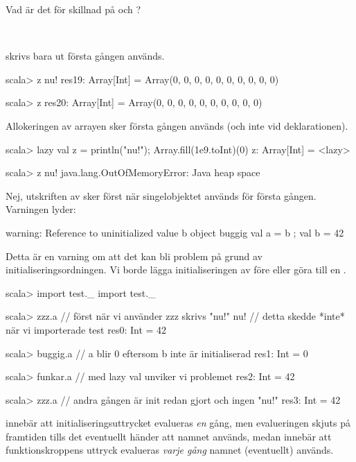 \Subtask Vad är det för skillnad på  och ?

\SOLUTION

\TaskSolved \what~

\SubtaskSolved {} skrivs bara ut första gången  används.
\begin{REPL}
scala> z
nu!
res19: Array[Int] = Array(0, 0, 0, 0, 0, 0, 0, 0, 0, 0)

scala> z
res20: Array[Int] = Array(0, 0, 0, 0, 0, 0, 0, 0, 0, 0)
\end{REPL}

\SubtaskSolved Allokeringen av arrayen sker första gången  används (och inte vid deklarationen).
\begin{REPL}
scala> lazy val z = { println("nu!"); Array.fill(1e9.toInt)(0)}
z: Array[Int] = <lazy>

scala> z
nu!
java.lang.OutOfMemoryError: Java heap space
\end{REPL}

\SubtaskSolved Nej, utskriften av  sker först när singelobjektet  används för första gången. Varningen lyder:
\begin{REPL}
warning: Reference to uninitialized value b
         object buggig { val a = b ; val b = 42}
\end{REPL}
\noindent Detta är en varning om att det kan bli problem på grund av initialiseringsordningen. Vi borde lägga initialiseringen av  före  eller göra  till en .

\SubtaskSolved
\begin{REPL}
scala> import test._
import test._

scala> zzz.a      // först när vi använder zzz skrivs "nu!"
nu!               // detta skedde *inte* när vi importerade test
res0: Int = 42

scala> buggig.a   // a blir 0 eftersom b inte är initialiserad
res1: Int = 0

scala> funkar.a   // med lazy val unviker vi problemet
res2: Int = 42


scala> zzz.a     // andra gången är init redan gjort och ingen "nu!"
res3: Int = 42
\end{REPL}

\SubtaskSolved {} innebär att initialiseringsuttrycket evalueras \emph{en} gång, men evalueringen skjuts på framtiden tills det eventuellt händer att namnet  används, medan  innebär att funktionskroppens uttryck evalueras \emph{varje gång} namnet  (eventuellt) används.


